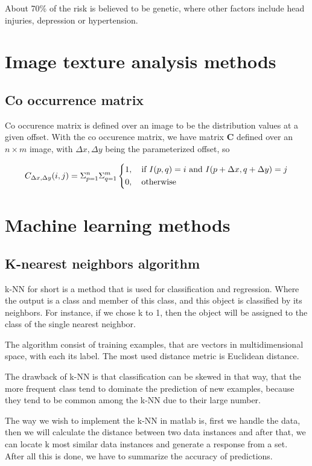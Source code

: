 About 70\% of the risk is believed to be genetic, where other factors include head injuries, depression or hypertension. \cite{Magnetic} 

\section{Image texture analysis methods}

\subsection{Co occurrence matrix}

Co occurence matrix is defined over an image to be the distribution values at a given offset.\cite{Bharati} With the co occurence matrix, we have matrix \textbf{C} defined over an $n \times m$ image, with $\Delta x, \Delta y$ being the parameterized offset, so

\[
C_{\Delta x, \Delta y}(i, j) = \Sigma_{p=1}^n\Sigma_{q=1}^m
\begin{dcases}
  1, \quad \text{if } I(p,q)=i \text{ and } I(p+\Delta x, q+ \Delta y) =j \\
  0, \quad \text{otherwise}
\end{dcases}
\]

\section{Machine learning methods}

\subsection{K-nearest neighbors algorithm}

k-NN for short is a method that is used for classification and regression. Where the output is a class and member of this class, and this object is classified by its neighbors. For instance, if we chose k to 1, then the object will be assigned to the class of the single nearest neighbor.

The algorithm consist of training examples, that are vectors in multidimensional space, with each its label. The most used distance metric is Euclidean distance.

The drawback of k-NN is that classification can be skewed in that way, that the more frequent class tend to dominate the prediction of new examples, because they tend to be common among the k-NN due to their large number.

The way we wish to implement the k-NN in matlab is, first we handle the data, then we will calculate the distance between two data instances and after that, we can locate k most similar data instances and generate a response from a set. After all this is done, we have to summarize the accuracy of predictions.



